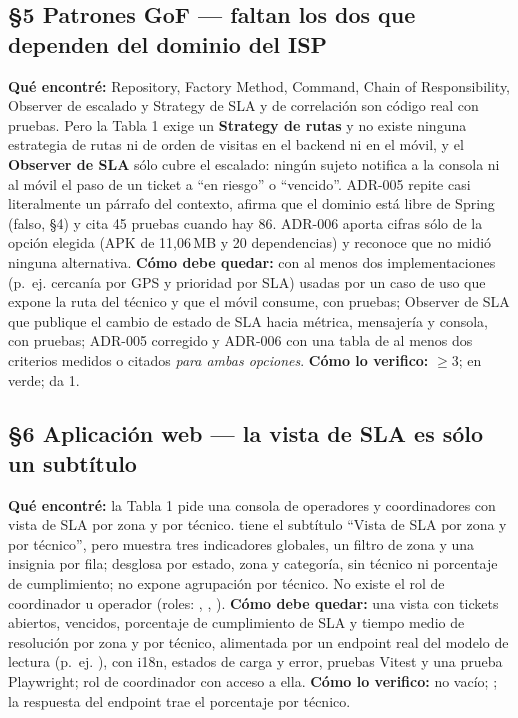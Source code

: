 \subsection*{\S5 Patrones GoF --- faltan los dos que dependen del dominio del ISP}
\textbf{Qu\'e encontr\'e:} Repository, Factory Method, Command, Chain of Responsibility, Observer de escalado y Strategy de SLA y de correlaci\'on son c\'odigo real con pruebas. Pero la Tabla 1 exige un \textbf{Strategy de rutas} y no existe ninguna estrategia de rutas ni de orden de visitas en el backend ni en el m\'ovil, y el \textbf{Observer de SLA} s\'olo cubre el escalado: ning\'un sujeto notifica a la consola ni al m\'ovil el paso de un ticket a ``en riesgo'' o ``vencido''. ADR-005 repite casi literalmente un p\'arrafo del contexto, afirma que el dominio est\'a libre de Spring (falso, \S4) y cita 45 pruebas cuando hay 86. ADR-006 aporta cifras s\'olo de la opci\'on elegida (APK de 11,06\,MB y 20 dependencias) y reconoce que no midi\'o ninguna alternativa. \textbf{C\'omo debe quedar:}  con al menos dos implementaciones (p.~ej. cercan\'ia por GPS y prioridad por SLA) usadas por un caso de uso que expone la ruta del t\'ecnico y que el m\'ovil consume, con pruebas; Observer de SLA que publique el cambio de estado de SLA hacia m\'etrica, mensajer\'ia y consola, con pruebas; ADR-005 corregido y ADR-006 con una tabla de al menos dos criterios medidos o citados \emph{para ambas opciones}. \textbf{C\'omo lo verifico:}  $\ge 3$;  en verde;  da 1.

\subsection*{\S6 Aplicaci\'on web --- la vista de SLA es s\'olo un subt\'itulo}
\textbf{Qu\'e encontr\'e:} la Tabla 1 pide una consola de operadores y coordinadores con vista de SLA por zona y por t\'ecnico.  tiene el subt\'itulo ``Vista de SLA por zona y por t\'ecnico'', pero  muestra tres indicadores globales, un filtro de zona y una insignia por fila;  desglosa por estado, zona y categor\'ia, sin t\'ecnico ni porcentaje de cumplimiento;  no expone agrupaci\'on por t\'ecnico. No existe el rol de coordinador u operador (roles: , , ). \textbf{C\'omo debe quedar:} una vista con tickets abiertos, vencidos, porcentaje de cumplimiento de SLA y tiempo medio de resoluci\'on por zona y por t\'ecnico, alimentada por un endpoint real del modelo de lectura (p.~ej. ), con i18n, estados de carga y error, pruebas Vitest y una prueba Playwright; rol de coordinador con acceso a ella. \textbf{C\'omo lo verifico:}  no vac\'io; ; la respuesta del endpoint trae el porcentaje por t\'ecnico.

